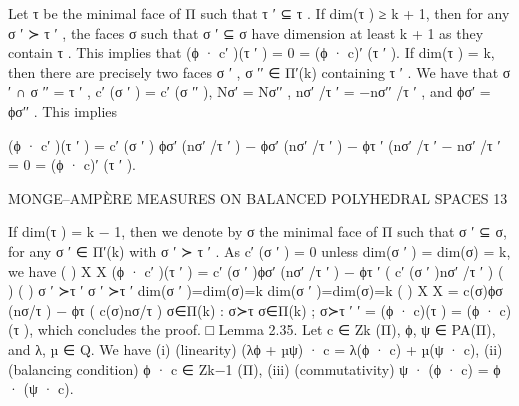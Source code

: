 \documentclass[
  11pt,
]{article}
\newenvironment{Shaded}{}{}
\newcommand{\NormalTok}[1]{#1}
\begin{document}
\begin{Shaded}
\begin{Highlighting}[]
\NormalTok{Let τ be the minimal face of Π such that τ ′ ⊆ τ . If dim(τ ) ≥ k + 1, then for any σ ′ ≻ τ ′ , the}
\NormalTok{faces σ such that σ ′ ⊆ σ have dimension at least k + 1 as they contain τ . This implies that}
\NormalTok{(ϕ · c′ )(τ ′ ) = 0 = (ϕ · c)′ (τ ′ ).}
\NormalTok{    If dim(τ ) = k, then there are precisely two faces σ ′ , σ ′′ ∈ Π′(k) containing τ ′ . We have that}
\NormalTok{σ ′ ∩ σ ′′ = τ ′ , c′ (σ ′ ) = c′ (σ ′′ ), Nσ′ = Nσ′′ , nσ′ /τ ′ = −nσ′′ /τ ′ , and ϕσ′ = ϕσ′′ . This implies}

\NormalTok{         (ϕ · c′ )(τ ′ ) = c′ (σ ′ ) ϕσ′ (nσ′ /τ ′ ) − ϕσ′ (nσ′ /τ ′ ) − ϕτ ′ (nσ′ /τ ′ − nσ′ /τ ′ = 0 = (ϕ · c)′ (τ ′ ).}
                                                                                                  
\NormalTok{                      MONGE–AMPÈRE MEASURES ON BALANCED POLYHEDRAL SPACES                                                    13}


\NormalTok{   If dim(τ ) = k − 1, then we denote by σ the minimal face of Π such that σ ′ ⊆ σ, for any σ ′ ∈ Π′(k)}
\NormalTok{with σ ′ ≻ τ ′ . As c′ (σ ′ ) = 0 unless dim(σ ′ ) = dim(σ) = k, we have}
\NormalTok{                                                                  (                        )}
\NormalTok{                                    X                                                        X}
\NormalTok{         (ϕ · c′ )(τ ′ ) =                        c′ (σ ′ )ϕσ′ (nσ′ /τ ′ ) − ϕτ ′ (                     c′ (σ ′ )nσ′ /τ ′ )}
\NormalTok{                                                                                  (                                       )}
\NormalTok{                                                                                  (                                       )}
\NormalTok{                                     σ ′ ≻τ ′                                              σ ′ ≻τ ′}
\NormalTok{                             dim(σ ′ )=dim(σ)=k                                    dim(σ ′ )=dim(σ)=k}
\NormalTok{                                                                      (                          )}
\NormalTok{                                 X                                           X}
\NormalTok{                       =                    c(σ)ϕσ (nσ/τ ) − ϕτ (                      c(σ)nσ/τ )}
\NormalTok{                             σ∈Π(k) : σ≻τ                               σ∈Π(k) ; σ≻τ}
\NormalTok{                                                     ′   ′}
\NormalTok{                       = (ϕ · c)(τ ) = (ϕ · c) (τ ),}
\NormalTok{which concludes the proof.                                                                                                    □}
\NormalTok{Lemma 2.35. Let c ∈ Zk (Π), ϕ, ψ ∈ PA(Π), and λ, µ ∈ Q. We have}
\NormalTok{    (i) (linearity) (λϕ + µψ) · c = λ(ϕ · c) + µ(ψ · c),}
\NormalTok{   (ii) (balancing condition) ϕ · c ∈ Zk−1 (Π),}
\NormalTok{  (iii) (commutativity) ψ · (ϕ · c) = ϕ · (ψ · c).}


\end{Highlighting}
\end{Shaded}
\end{document}
